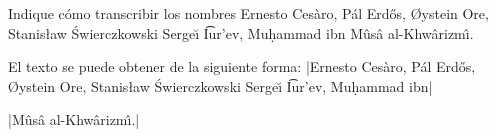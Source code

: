 

\bigskip

\enunciadoS Indique c\'omo transcribir los nombres Ernesto Ces\`aro, P\'al Erd\H{o}s, {\O}ystein Ore, Stanis{\l}aw \'Swierczkowski Serge\u{\i} \t{Iu}r'ev, Mu\d{h}ammad ibn M\^us\^a al-Khw\^arizm\^\i.

\bigskip

\respuestaS El texto se puede obtener de la siguiente forma: |Ernesto Ces\`aro, P\'al Erd\H{o}s, {\O}ystein Ore, Stanis{\l}aw \'Swierczkowski Serge\u{\i} \t{Iu}r'ev, Mu\d{h}ammad ibn|

\noindent|M\^us\^a al-Khw\^arizm\^\i.|

\bye